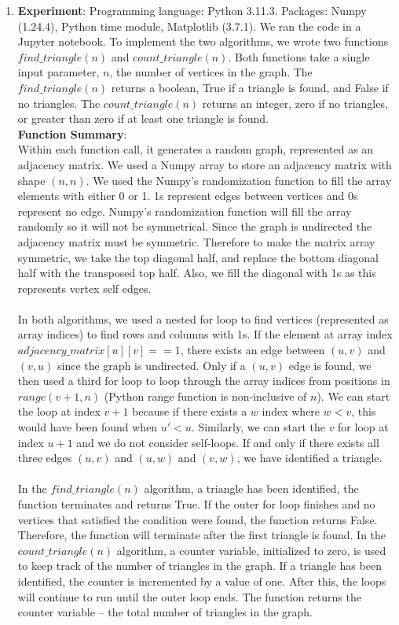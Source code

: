 \documentclass[12pt, letterpaper]{article}
\begin{document}
\begin{enumerate}
\newpage
\item
\textbf{Experiment}:
    Programming language: Python 3.11.3. Packages: Numpy (1.24.4), Python time module, Matplotlib (3.7.1). We ran the code in a Jupyter notebook. To implement the two algorithms, we wrote two functions $find\_triangle(n)$ and $count\_triangle(n)$. Both functions take a single input parameter, $n$, the number of vertices in the graph. The $find\_triangle(n)$ returns a boolean, True if a triangle is found, and False if no triangles. The $count\_triangle(n)$ returns an integer, zero if no triangles, or greater than zero if at least one triangle is found.\\
    \textbf{Function Summary}: \\
    Within each function call, it generates a random graph, represented as an adjacency matrix. We used a Numpy array to store an adjacency matrix with shape $(n, n)$. We used the Numpy's randomization function to fill the array elements with either 0 or 1. 1s represent edges between vertices and 0s represent no edge. Numpy's randomization function will fill the array randomly so it will not be symmetrical. Since the graph is undirected the adjacency matrix must be symmetric. Therefore to make the matrix array symmetric, we take the top diagonal half, and replace the bottom diagonal half with the transposed top half. Also, we fill the diagonal with 1s as this represents vertex self edges. \\\\
    In both algorithms, we used a nested for loop to find vertices (represented as array indices) to find rows and columns with 1s. If the element at array index $adjacency\_matrix[u][v] == 1$, there exists an edge between $(u,v)$ and $(v,u)$ since the graph is undirected. Only if a $(u,v)$ edge is found, we then used a third for loop to loop through the array indices from positions in $range(v+1, n)$ (Python range function is non-inclusive of $n$). We can start the loop at index $v+1$ because if there exists a $w$ index where $w < v$, this would have been found when $u' < u$. Similarly, we can start the $v$ for loop at index $u+1$ and we do not consider self-loops. If and only if there exists all three edges $(u,v)$ and $(u,w)$ and $(v,w)$, we have identified a triangle.\\\\
    In the $find\_triangle(n)$ algorithm, a triangle has been identified, the function terminates and returns True. If the outer for loop finishes and no vertices that satisfied the condition were found, the function returns False. Therefore, the function will terminate after the first triangle is found. In the $count\_triangle(n)$ algorithm, a counter variable, initialized to zero, is used to keep track of the number of triangles in the graph. If a triangle has been identified, the counter is incremented by a value of one. After this, the loops will continue to run until the outer loop ends. The function returns the counter variable -- the total number of triangles in the graph. \\\\

\end{enumerate}
\end{document}

